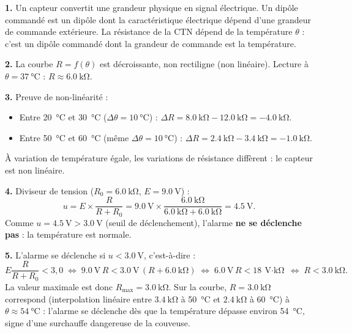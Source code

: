 \documentclass[11pt]{article}
\newcommand{\cle}[1]{{\popxbold\color{popdark}#1}}
\begin{document}
\begin{corrige}
\textbf{1.} Un \cle{capteur} convertit une grandeur physique en signal électrique. Un \cle{dipôle commandé} est un dipôle dont la caractéristique électrique dépend d'une grandeur de commande extérieure. La résistance de la CTN dépend de la température $\theta$ : c'est un dipôle commandé dont la grandeur de commande est la température.

\textbf{2.} La courbe $R = f(\theta)$ est décroissante, non rectiligne (non linéaire). Lecture à $\theta = \SI{37}{\celsius}$ : $R \approx \SI{6,0}{\kilo\ohm}$.

\textbf{3.} Preuve de non-linéarité : 
\begin{itemize}
\item Entre \SI{20}{\celsius} et \SI{30}{\celsius} ($\Delta\theta = \SI{10}{\celsius}$) : $\Delta R = \SI{8,0}{\kilo\ohm} - \SI{12,0}{\kilo\ohm} = \SI{-4,0}{\kilo\ohm}$.
\item Entre \SI{50}{\celsius} et \SI{60}{\celsius} (même $\Delta\theta = \SI{10}{\celsius}$) : $\Delta R = \SI{2,4}{\kilo\ohm} - \SI{3,4}{\kilo\ohm} = \SI{-1,0}{\kilo\ohm}$.
\end{itemize}
À variation de température égale, les variations de résistance diffèrent : le capteur est \cle{non linéaire}.

\textbf{4.} Diviseur de tension ($R_0 = \SI{6,0}{\kilo\ohm}$, $E = \SI{9,0}{\volt}$) : 
\[ u = E \times \frac{R}{R + R_0} = \SI{9,0}{\volt} \times \frac{\SI{6,0}{\kilo\ohm}}{\SI{6,0}{\kilo\ohm} + \SI{6,0}{\kilo\ohm}} = \SI{4,5}{\volt}. \]
Comme $u = \SI{4,5}{\volt} > \SI{3,0}{\volt}$ (seuil de déclenchement), l'alarme \textbf{ne se déclenche pas} : la température est normale.

\textbf{5.} L'alarme se déclenche si $u < \SI{3,0}{\volt}$, c'est-à-dire :
\[ E \frac{R}{R + R_0} < 3,0 \;\Longleftrightarrow\; \SI{9,0}{\volt}\,R < \SI{3,0}{\volt}\,(R + \SI{6,0}{\kilo\ohm}) \;\Longleftrightarrow\; \SI{6,0}{\volt}\,R < \SI{18}{\volt\cdot\kilo\ohm} \;\Longleftrightarrow\; R < \SI{3,0}{\kilo\ohm}. \]
La valeur maximale est donc $R_{\max} = \SI{3,0}{\kilo\ohm}$. Sur la courbe, $R = \SI{3,0}{\kilo\ohm}$ correspond (interpolation linéaire entre $\SI{3,4}{\kilo\ohm}$ à \SI{50}{\celsius} et $\SI{2,4}{\kilo\ohm}$ à \SI{60}{\celsius}) à $\theta \approx \SI{54}{\celsius}$ : l'alarme se déclenche dès que la température dépasse environ \SI{54}{\celsius}, signe d'une surchauffe dangereuse de la couveuse.


\end{corrige}
\end{document}
